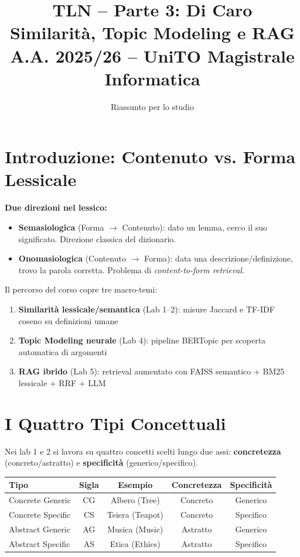 \documentclass[12pt,a4paper]{article}
\title{\textbf{TLN -- Parte 3: Di Caro}\\[0.3em]
\large Similarit\`a, Topic Modeling e RAG\\[0.2em]
\normalsize A.A. 2025/26 -- UniTO Magistrale Informatica}
\author{Riassunto per lo studio}
\date{}
\begin{document}
\maketitle
\tableofcontents
\newpage

\section{Introduzione: Contenuto vs. Forma Lessicale}

\begin{defbox}
\textbf{Due direzioni nel lessico:}
\begin{itemize}
  \item \textbf{Semasiologica} (Forma $\to$ Contenuto): dato un lemma, cerco il suo significato. Direzione classica del dizionario.
  \item \textbf{Onomasiologica} (Contenuto $\to$ Forma): data una descrizione/definizione, trovo la parola corretta. Problema di \emph{content-to-form retrieval}.
\end{itemize}
\end{defbox}

\medskip
Il percorso del corso copre tre macro-temi:
\begin{enumerate}
  \item \textbf{Similarit\`a lessicale/semantica} (Lab 1--2): misure Jaccard e TF-IDF coseno su definizioni umane
  \item \textbf{Topic Modeling neurale} (Lab 4): pipeline BERTopic per scoperta automatica di argomenti
  \item \textbf{RAG ibrido} (Lab 5): retrieval aumentato con FAISS semantico + BM25 lessicale + RRF + LLM
\end{enumerate}

\section{I Quattro Tipi Concettuali}

Nei lab 1 e 2 si lavora su quattro concetti scelti lungo due assi: \textbf{concretezza} (concreto/astratto) e \textbf{specificit\`a} (generico/specifico).

\begin{center}
\begin{tabular}{lcccc}
\toprule
\textbf{Tipo} & \textbf{Sigla} & \textbf{Esempio} & \textbf{Concretezza} & \textbf{Specificit\`a}\\
\midrule
Concrete Generic   & CG & Albero (Tree)  & Concreto  & Generico \\
Concrete Specific  & CS & Teiera (Teapot) & Concreto  & Specifico \\
Abstract Generic   & AG & Musica (Music)  & Astratto  & Generico \\
Abstract Specific  & AS & Etica (Ethics)  & Astratto  & Specifico \\
\bottomrule
\end{tabular}
\end{center}
\end{document}
